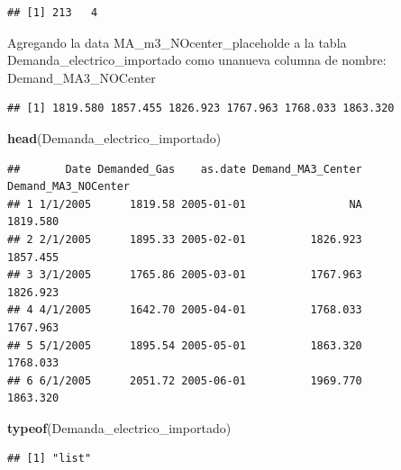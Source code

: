 \documentclass[
]{article}
\newenvironment{Shaded}{\begin{snugshade}}{\end{snugshade}}
\newcommand{\FunctionTok}[1]{\textcolor[rgb]{0.13,0.29,0.53}{\textbf{#1}}}
\newcommand{\NormalTok}[1]{#1}
\newcommand{\OtherTok}[1]{\textcolor[rgb]{0.56,0.35,0.01}{#1}}
\newcommand{\SpecialCharTok}[1]{\textcolor[rgb]{0.81,0.36,0.00}{\textbf{#1}}}
\begin{document}
\begin{verbatim}
## [1] 213   4
\end{verbatim}

Agregando la data MA\_m3\_NOcenter\_placeholde a la tabla
Demanda\_electrico\_importado como unanueva columna de nombre:
Demand\_MA3\_NOCenter

\begin{Shaded}
\end{Shaded}

\begin{verbatim}
## [1] 1819.580 1857.455 1826.923 1767.963 1768.033 1863.320
\end{verbatim}

\begin{Shaded}
\begin{Highlighting}[]
\FunctionTok{head}\NormalTok{(Demanda\_electrico\_importado)}
\end{Highlighting}
\end{Shaded}

\begin{verbatim}
##       Date Demanded_Gas    as.date Demand_MA3_Center Demand_MA3_NOCenter
## 1 1/1/2005      1819.58 2005-01-01                NA            1819.580
## 2 2/1/2005      1895.33 2005-02-01          1826.923            1857.455
## 3 3/1/2005      1765.86 2005-03-01          1767.963            1826.923
## 4 4/1/2005      1642.70 2005-04-01          1768.033            1767.963
## 5 5/1/2005      1895.54 2005-05-01          1863.320            1768.033
## 6 6/1/2005      2051.72 2005-06-01          1969.770            1863.320
\end{verbatim}

\begin{Shaded}
\begin{Highlighting}[]
\FunctionTok{typeof}\NormalTok{(Demanda\_electrico\_importado)}
\end{Highlighting}
\end{Shaded}

\begin{verbatim}
## [1] "list"
\end{verbatim}
\end{document}
